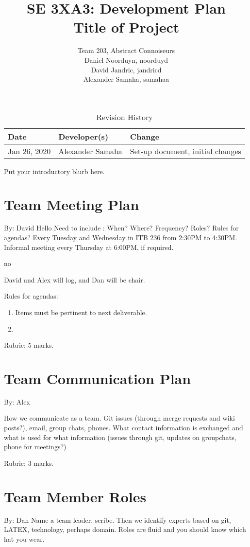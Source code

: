 \documentclass{article}
\title{SE 3XA3: Development Plan\\Title of Project}
\author{Team 203, Abstract Connoiseurs\\
Daniel Noorduyn, noorduyd\\
David Jandric, jandricd\\
Alexander Samaha, samahaa\\
}
\date{}
\begin{document}
\begin{table}[hp]
\caption{Revision History} \label{TblRevisionHistory}
\begin{tabularx}{\textwidth}{llX}
\toprule
\textbf{Date} & \textbf{Developer(s)} & \textbf{Change}\\
\midrule
Jan 26, 2020 & Alexander Samaha & Set-up document, initial changes\\
\bottomrule
\end{tabularx}
\end{table}

\newpage

\maketitle

Put your introductory blurb here.

\section{Team Meeting Plan}

By: David
Hello
Need to include :  When?  Where?  Frequency?  Roles?  Rules for agendas?
Every Tuesday and Wednesday in ITB 236 from 2:30PM to 4:30PM.
Informal meeting every Thursday at 6:00PM, if required.

no

David and Alex will log, and Dan will be chair.

Rules for agendas:
\begin{enumerate}
    \item Items must be pertinent to next deliverable.
    \item
\end{enumerate}


Rubric:  5 marks.

\section{Team Communication Plan}
By: Alex

How we communicate as a team.  Git issues (through merge requests and wiki
posts?), email, group chats, phones.  What contact information is exchanged and
what is used for what information (issues through git,  updates on groupchats,
phone for meetings?)

Rubric:  3 marks.

\section{Team Member Roles}
By: Dan
Name  a  team  leader,  scribe.   Then  we  identify  experts  based  on  git,
LATEX,
technology,  perhaps  domain.   Roles  are  fluid  and  you  should  know
which  hat
you wear.
\end{document}
